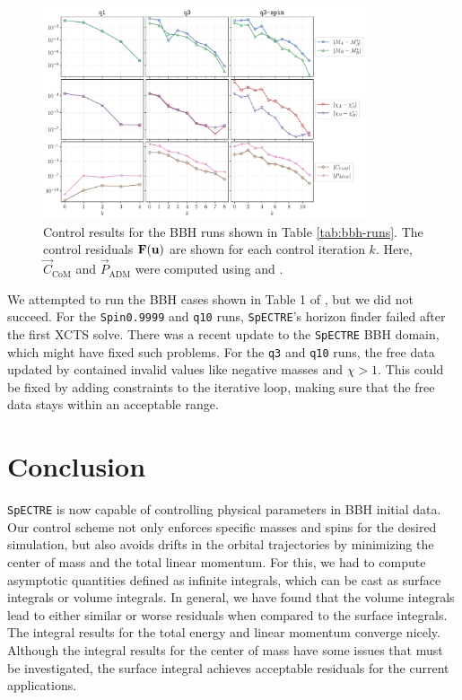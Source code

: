 \documentclass{../document}
\begin{document}
      \begin{figure}
        \centering
        \includegraphics[width=0.85\textwidth]{../../plots/final_report/control_iterations.pdf}
        \caption{Control results for the BBH runs shown in Table \ref{tab:bbh-runs}. The control residuals ${\bf F}({\bf u})$ are shown for each control iteration $k$. Here, $\vec C_\text{CoM}$ and $\vec P_\text{ADM}$ were computed using \eq{\eqref{eq:CoM-surf-1}} and \eq{\eqref{eq:Padm-surf}}.}
        \label{fig:control_iterations}
      \end{figure}

      We attempted to run the BBH cases shown in Table 1 of \cite{Serguei}, but we did not succeed. For the {\tt Spin0.9999} and {\tt q10} runs, {\tt SpECTRE}'s horizon finder failed after the first XCTS solve. There was a recent update to the {\tt SpECTRE} BBH domain, which might have fixed such problems. For the {\tt q3} and {\tt q10} runs, the free data updated by \eq{\eqref{eq:u-iteration}} contained invalid values like negative masses and $\chi > 1$. This could be fixed by adding constraints to the iterative loop, making sure that the free data stays within an acceptable range.

  \section{Conclusion}

    {\tt SpECTRE} is now capable of controlling physical parameters in BBH initial data. Our control scheme not only enforces specific masses and spins for the desired simulation, but also avoids drifts in the orbital trajectories by minimizing the center of mass and the total linear momentum. For this, we had to compute asymptotic quantities defined as infinite integrals, which can be cast as surface integrals or volume integrals. In general, we have found that the volume integrals lead to either similar or worse residuals when compared to the surface integrals. The integral results for the total energy and linear momentum converge nicely. Although the integral results for the center of mass have some issues that must be investigated, the surface integral achieves acceptable residuals for the current applications.
\end{document}
